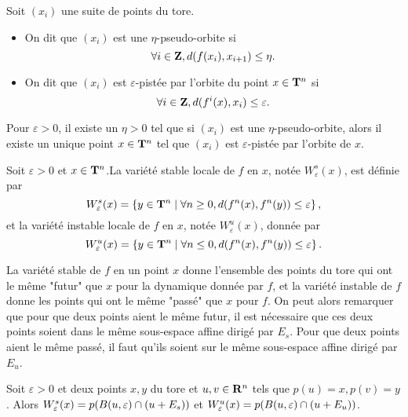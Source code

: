   \begin{definition}
    Soit $(x_i)$ une suite de points du tore.
    \begin{itemize}
      \item On dit que $(x_i)$ est une $\eta$-pseudo-orbite si
	$$\forall i \in \mathbf Z, d(f(x_i), x_{i+1}) \leq \eta.$$
      \item On dit que $(x_i)$ est $\varepsilon$-pistée par l'orbite du point $x \in \mathbf T^n$ si
	$$\forall i \in \mathbf Z, d(f^i(x), x_i) \leq \varepsilon.$$
    \end{itemize}
  \end{definition}

  \begin{lemma}
    Pour $\varepsilon > 0$, il existe un $\eta > 0$ tel que si $(x_i)$ est une $\eta$-pseudo-orbite,
    alors il existe un unique point $x \in \mathbf T^n$ tel que $(x_i)$ est $\varepsilon$-pistée par l'orbite de $x$.
  \end{lemma}

  \begin{definition}
    Soit $\varepsilon > 0$ et $x \in \mathbf T^n$.La variété stable locale de $f$ en $x$, notée $W^s_{\varepsilon}(x)$, est définie par
    $$W^s_{\varepsilon}(x) = \left\{y \in \mathbf T^n \mid \forall n \geq 0, d(f^n(x), f^n(y)) \leq \varepsilon\right\},$$
    et la variété instable locale de $f$ en $x$, notée $W_{\varepsilon}^u(x)$, donnée par
    $$W^u_{\varepsilon}(x) = \left\{y \in \mathbf T^n \mid \forall n \leq 0, d(f^n(x), f^n(y)) \leq \varepsilon\right\}.$$
  \end{definition}

  \begin{remark}
    La variété stable de $f$ en un point $x$ donne l'ensemble des points du tore qui ont le même "futur" que $x$ pour la dynamique donnée par $f$,
    et la variété instable de $f$ donne les points qui ont le même "passé" que $x$ pour $f$.
    On peut alors remarquer que pour que deux points aient le même futur,
    il est nécessaire que ces deux points soient dans le même sous-espace affine dirigé par $E_s$.
    Pour que deux points aient le même passé, il faut qu'ils soient sur le même sous-espace affine dirigé par $E_u$.
  \end{remark}

  \begin{proposition}
    Soit $\varepsilon > 0$ et deux points $x, y$ du tore et $u, v \in \mathbf R^n$ tels que $p(u) = x, p(v)= y$.
    Alors $W^s_{\varepsilon}(x) = p(B(u, \varepsilon) \cap (u + E_s))$ et $W^u_{\varepsilon}(x) = p(B(u, \varepsilon) \cap (u + E_u))$.
  \end{proposition}


